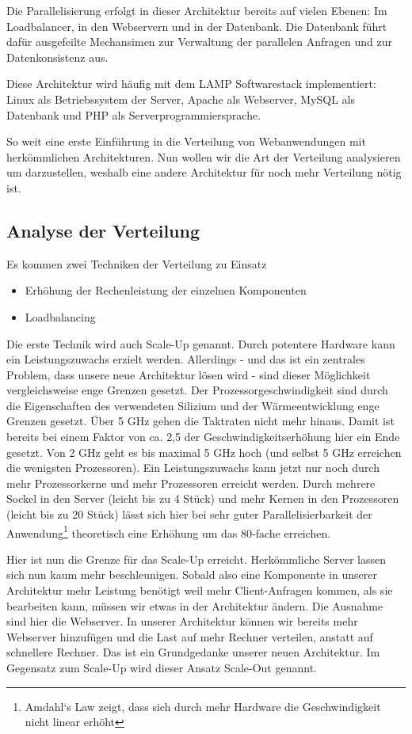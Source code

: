 Die Parallelisierung erfolgt in dieser Architektur bereits auf vielen Ebenen: Im Loadbalancer, in den Webservern und in der
Datenbank. Die Datenbank führt dafür ausgefeilte Mechansimen zur Verwaltung der parallelen Anfragen und zur
Datenkonsistenz aus.

Diese Architektur wird häufig mit dem LAMP Softwarestack implementiert: Linux als Betriebssystem der Server,
Apache als Webserver, MySQL als Datenbank und PHP als Serverprogrammiersprache.

So weit eine erste Einführung in die Verteilung von Webanwendungen mit herkömmlichen Architekturen.
Nun wollen wir die Art der Verteilung analysieren um darzustellen, weshalb eine andere Architektur für noch
mehr Verteilung nötig ist.

\subsection{Analyse der Verteilung}
Es kommen zwei Techniken der Verteilung zu Einsatz
\begin{itemize}
  \item Erhöhung der Rechenleistung der einzelnen Komponenten
  \item Loadbalancing
\end{itemize}

Die erste Technik wird auch Scale-Up genannt. Durch potentere Hardware kann ein Leistungszuwachs erzielt werden.
Allerdings - und das ist ein zentrales Problem, dass unsere neue Architektur lösen wird - sind dieser Möglichkeit
vergleichsweise enge Grenzen gesetzt. Der Prozessorgeschwindigkeit sind durch die Eigenschaften des verwendeten
Silizium und der Wärmeentwicklung enge Grenzen gesetzt. Über 5 GHz gehen die Taktraten nicht mehr hinaus.
Damit ist bereits bei einem Faktor von ca. 2,5 der Geschwindigkeitserhöhung hier ein Ende gesetzt. Von 2 GHz
geht es bis maximal 5 GHz hoch (und selbst 5 GHz erreichen die wenigsten Prozessoren). Ein Leistungszuwachs
kann jetzt nur noch durch mehr Prozessorkerne und mehr Prozessoren erreicht werden. Durch mehrere Sockel
in den Server (leicht bis zu 4 Stück) und mehr Kernen in den Prozessoren (leicht bis zu 20 Stück) lässt sich hier
bei sehr guter Parallelisierbarkeit der Anwendung\footnote{Amdahl‘s Law zeigt, dass sich durch mehr
Hardware die Geschwindigkeit nicht linear erhöht} theoretisch eine Erhöhung um das 80-fache erreichen.

Hier ist nun die Grenze für das Scale-Up erreicht. Herkömmliche Server lassen sich nun kaum mehr beschleunigen.
Sobald also eine Komponente in unserer Architektur mehr Leistung benötigt weil mehr Client-Anfragen kommen,
als sie bearbeiten kann, müssen wir etwas in der Architektur ändern. Die Ausnahme sind hier die Webserver.
In unserer Architektur können wir bereits mehr Webserver hinzufügen und die Last auf mehr Rechner verteilen,
anstatt auf schnellere Rechner. Das ist ein Grundgedanke unserer neuen Architektur. Im Gegensatz zum Scale-Up
wird dieser Ansatz Scale-Out genannt.


